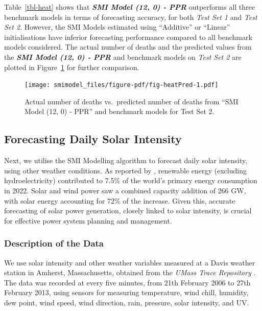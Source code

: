 \documentclass[11pt,a4paper,]{article}
\begin{document}
Table~\ref{tbl-heat} shows that \textbf{\emph{SMI Model (12, 0) - PPR}}
outperforms all three benchmark models in terms of forecasting accuracy,
for both \emph{Test Set 1} and \emph{Test Set 2}. However, the SMI
Models estimated using ``Additive'' or ``Linear'' initialisations have
inferior forecasting performance compared to all benchmark models
considered. The actual number of deaths and the predicted values from
the \textbf{\emph{SMI Model (12, 0) - PPR}} and benchmark models on
\emph{Test Set 2} are plotted in Figure~\ref{fig-heatPred} for further
comparison.

\begin{figure}

{\centering \texttt{[image: smimodel\_files/figure-pdf/fig-heatPred-1.pdf]}

}

\caption{\label{fig-heatPred}Actual number of deaths vs.~predicted
number of deaths from ``SMI Model (12, 0) - PPR'' and benchmark models
for Test Set 2.}

\end{figure}

\hypertarget{sec-solar}{%
\subsection{Forecasting Daily Solar Intensity}\label{sec-solar}}

Next, we utilise the SMI Modelling algorithm to forecast daily solar
intensity, using other weather conditions. As reported by
\textcite{EI2023}, renewable energy (excluding hydroelectricity)
contributed to 7.5\% of the world's primary energy consumption in 2022.
Solar and wind power saw a combined capacity addition of 266 GW, with
solar energy accounting for 72\% of the increase. Given this, accurate
forecasting of solar power generation, closely linked to solar
intensity, is crucial for effective power system planning and
management.

\hypertarget{description-of-the-data-1}{%
\subsubsection{Description of the
Data}\label{description-of-the-data-1}}

We use solar intensity and other weather variables measured at a Davis
weather station in Amherst, Massachusetts, obtained from the \emph{UMass
Trace Repository} \autocite{Umass2023}. The data was recorded at every
five minutes, from 21th February 2006 to 27th February 2013, using
sensors for measuring temperature, wind chill, humidity, dew point, wind
speed, wind direction, rain, pressure, solar intensity, and UV.
\end{document}
